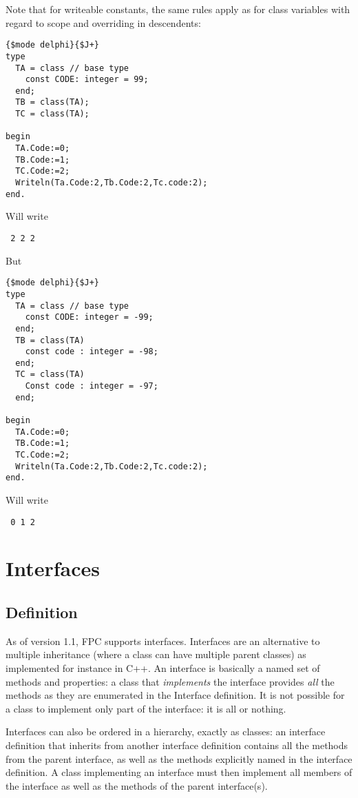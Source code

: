 Note that for writeable constants, the same rules apply as for class
variables with regard to scope and overriding in descendents:
\begin{verbatim}
{$mode delphi}{$J+}
type
  TA = class // base type
    const CODE: integer = 99;
  end;
  TB = class(TA); 
  TC = class(TA);

begin
  TA.Code:=0;
  TB.Code:=1;
  TC.Code:=2;
  Writeln(Ta.Code:2,Tb.Code:2,Tc.code:2);
end.
\end{verbatim}
Will write
\begin{verbatim}
 2 2 2
\end{verbatim}
But
\begin{verbatim}
{$mode delphi}{$J+}
type
  TA = class // base type
    const CODE: integer = -99;
  end;
  TB = class(TA)
    const code : integer = -98;
  end; 
  TC = class(TA)
    Const code : integer = -97;
  end;

begin
  TA.Code:=0;
  TB.Code:=1;
  TC.Code:=2;
  Writeln(Ta.Code:2,Tb.Code:2,Tc.code:2);
end.
\end{verbatim}
Will write
\begin{verbatim}
 0 1 2
\end{verbatim}

\chapter{Interfaces}
\label{ch:Interfaces}
\section{Definition}
As of version 1.1, FPC supports interfaces. Interfaces are an 
alternative to multiple inheritance (where a class can have multiple
parent classes) as implemented for instance in C++.  An interface is
basically a named set of methods and properties: a class that 
{\em implements} the interface provides {\em all} the methods as 
they are enumerated in the Interface definition. It is not possible for a
class to implement only part of the interface: it is all or nothing.

Interfaces can also be ordered in a hierarchy, exactly as classes:
an interface definition that inherits from another interface definition
contains all the methods from the parent interface, as well as the methods
explicitly named in the interface definition. A class implementing an
interface must then implement all members of the interface as well as the
methods of the parent interface(s).

